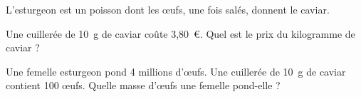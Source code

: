 L'esturgeon est un poisson dont les \oe ufs, une fois salés, donnent
 le caviar.
\begin{myenumerate}
\item Une cuillerée de 10~g de caviar coûte 3,80~\textgreek{\euro}.
 Quel est le prix du kilogramme de caviar ?
\item Une femelle esturgeon pond 4 millions d'\oe ufs. Une cuillerée de 10~g de caviar contient 100 \oe ufs.
 Quelle masse d'\oe ufs une femelle pond-elle ?
\end{myenumerate}